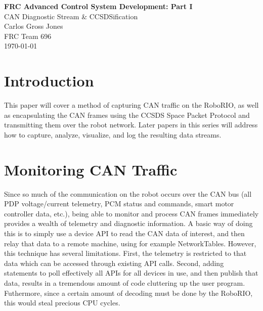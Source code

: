 \documentclass[12pt]{article}
\begin{document}
	\begin{titlepage}
	\begin{center}
		
	
	\vspace*{1in}
	{\Huge \textbf{FRC Advanced Control System Development: Part I}}\\
	\vspace{0.25in}
	{\LARGE CAN Diagnostic Stream \& CCSDSification}\\
	\vspace{0.5in}
	{\Large Carlos Gross Jones}\\
	\vspace{0.1in}
	{\Large FRC Team 696}\\
	\vspace{0.1in}
	{\Large \today}\\
\end{center}
	
\end{titlepage}


\section{Introduction}
\par This paper will cover a method of capturing CAN traffic on the RoboRIO, as well as encapsulating the CAN frames using the CCSDS Space Packet Protocol and transmitting them over the robot network. Later papers in this series will address how to capture, analyze, visualize, and log the resulting data streams. 


\section{Monitoring CAN Traffic}
\par Since so much of the communication on the robot occurs over the CAN bus (all PDP voltage/current telemetry, PCM status and commands, smart motor controller data, etc.), being able to monitor and process CAN frames immediately provides a wealth of telemetry and diagnostic information. A basic way of doing this is to simply use a device API to read the CAN data of interest, and then relay that data to a remote machine, using for example NetworkTables. However, this technique has several limitations. First, the telemetry is restricted to that data which can be accessed through existing API calls. Second, adding statements to poll effectively all APIs for all devices in use, and then publish that data, results in a tremendous amount of code cluttering up the user program. Futhermore, since a certain amount of decoding must be done by the RoboRIO, this would steal precious CPU cycles. 
\end{document}
